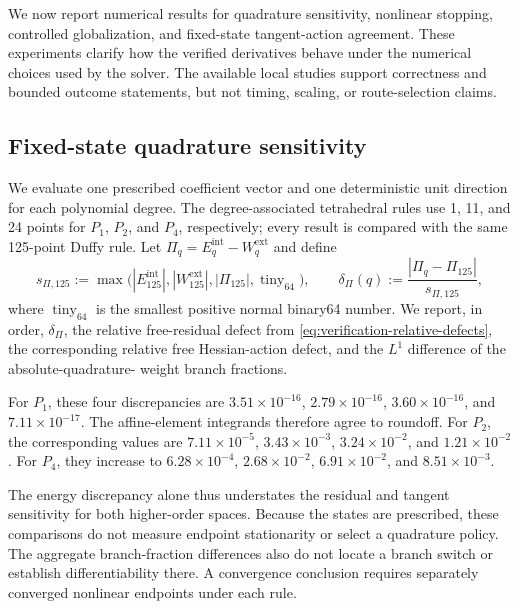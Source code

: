 \label{sec:performance-solver-behavior}

We now report numerical results for quadrature sensitivity, nonlinear stopping,
controlled globalization, and fixed-state tangent-action agreement. These experiments
clarify how the verified derivatives behave under the numerical choices used by
the solver. The available local studies support correctness and bounded
outcome statements, but not timing, scaling, or route-selection claims.

\subsection{Fixed-state quadrature sensitivity}
\label{subsec:quadrature-sensitivity}

We evaluate one prescribed coefficient vector and one deterministic unit
direction for each polynomial degree. The degree-associated tetrahedral rules
use 1, 11, and 24 points for $P_1$, $P_2$, and $P_4$, respectively; every
result is compared with the same 125-point Duffy rule. Let
$\Pi_q=E_q^{\mathrm{int}}-W_q^{\mathrm{ext}}$ and define
\begin{equation}
  s_{\Pi,125}:=\max\bigl(
  |E_{125}^{\mathrm{int}}|,|W_{125}^{\mathrm{ext}}|,|\Pi_{125}|,
  \operatorname{tiny}_{64}\bigr),
  \qquad
  \delta_\Pi(q):=\frac{|\Pi_q-\Pi_{125}|}{s_{\Pi,125}},
  \label{eq:quadrature-energy-scale}
\end{equation}
where $\operatorname{tiny}_{64}$ is the smallest positive normal binary64
number. We report, in order, $\delta_\Pi$, the relative free-residual defect
from \eqref{eq:verification-relative-defects}, the corresponding relative free
Hessian-action defect, and the $L^1$ difference of the absolute-quadrature-
weight branch fractions.

For $P_1$, these four discrepancies are $3.51\times10^{-16}$,
$2.79\times10^{-16}$, $3.60\times10^{-16}$, and
$7.11\times10^{-17}$. The affine-element integrands therefore agree to
roundoff. For $P_2$, the corresponding values are $7.11\times10^{-5}$,
$3.43\times10^{-3}$, $3.24\times10^{-2}$, and
$1.21\times10^{-2}$. For $P_4$, they increase to
$6.28\times10^{-4}$, $2.68\times10^{-2}$,
$6.91\times10^{-2}$, and $8.51\times10^{-3}$.

The energy discrepancy alone thus understates the residual and tangent
sensitivity for both higher-order spaces. Because the states are prescribed,
these comparisons do not measure endpoint stationarity or select a quadrature
policy. The aggregate branch-fraction differences also do not locate a branch
switch or establish differentiability there. A convergence conclusion requires
separately converged nonlinear endpoints under each rule.

